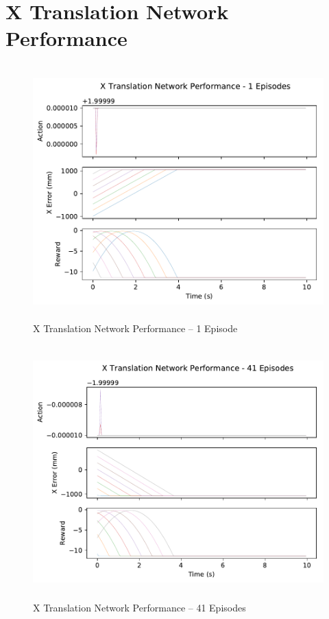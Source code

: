 \chapter{X Translation Network Performance}
\label{appendix:x_perf}
\begin{figure}[H]
	\centering
	\includegraphics[width=6in, height=3.85in, keepaspectratio]{figures/train_figs/transx_transitions/1_1.pdf}
	\caption{X Translation Network Performance -- 1 Episode}
\end{figure}
\begin{figure}[H]
	\centering
	\includegraphics[width=6in, height=3.85in, keepaspectratio]{figures/train_figs/transx_transitions/1_41.pdf}
	\caption{X Translation Network Performance -- 41 Episodes}
\end{figure}

